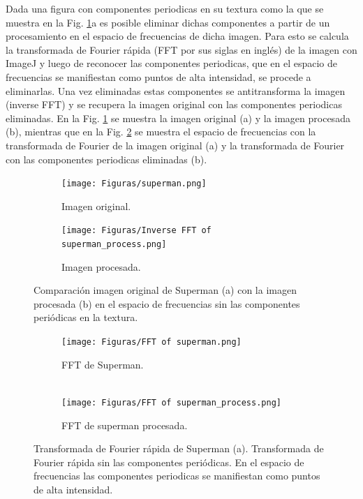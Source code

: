 \documentclass[11pt,twocolumn,twoside]{opticajnl}
\begin{document}
\vspace{0.3cm}

Dada una figura con componentes periodicas en su textura como la que se muestra en la Fig. \ref{fig:superman}a es posible eliminar dichas componentes a partir de un procesamiento en el espacio de frecuencias de dicha imagen. Para esto se calcula la transformada de Fourier rápida (FFT por sus siglas en inglés) de la imagen con ImageJ y luego de reconocer las componentes periodicas, que en el espacio de frecuencias se manifiestan como puntos de alta intensidad, se procede a eliminarlas. Una vez eliminadas estas componentes se antitransforma la imagen (inverse FFT) y se recupera la imagen original con las componentes periodicas eliminadas. En la Fig. \ref{fig:superman} se muestra la imagen original (a) y la imagen procesada (b), mientras que en la Fig. \ref{fig:supermanfft} se muestra el espacio de frecuencias con la transformada de Fourier de la imagen original (a) y la transformada de Fourier con las componentes periodicas eliminadas (b). 

\begin{figure}[h]
    \centering
         \begin{subfigure}[h]{0.49\linewidth}
            \centering
            \texttt{[image: Figuras/superman.png]}
            \caption{Imagen original.} 
         \end{subfigure}
         \begin{subfigure}[h]{0.49\linewidth}
            \centering
            \texttt{[image: Figuras/Inverse FFT of superman\_process.png]}
            \caption{Imagen procesada.}
         \end{subfigure}
    \caption{Comparación imagen original de Superman (a) con la imagen procesada (b) en el espacio de frecuencias sin las componentes periódicas en la textura.}
    \label{fig:superman}
\end{figure}


\begin{figure}[h]
    \centering
         \begin{subfigure}[h]{0.49\linewidth}
            \centering
            \texttt{[image: Figuras/FFT of superman.png]}
            \caption{FFT de Superman. \\
            $~$} 
         \end{subfigure}
         \begin{subfigure}[h]{0.49\linewidth}
            \centering
            \texttt{[image: Figuras/FFT of superman\_process.png]}
            \caption{FFT de superman procesada.}
         \end{subfigure}
    \caption{Transformada de Fourier rápida de Superman (a). Transformada de Fourier rápida sin las componentes periódicas. En el espacio de frecuencias las componentes periodicas se manifiestan como puntos de alta intensidad.}
    \label{fig:supermanfft}
\end{figure}
\end{document}
